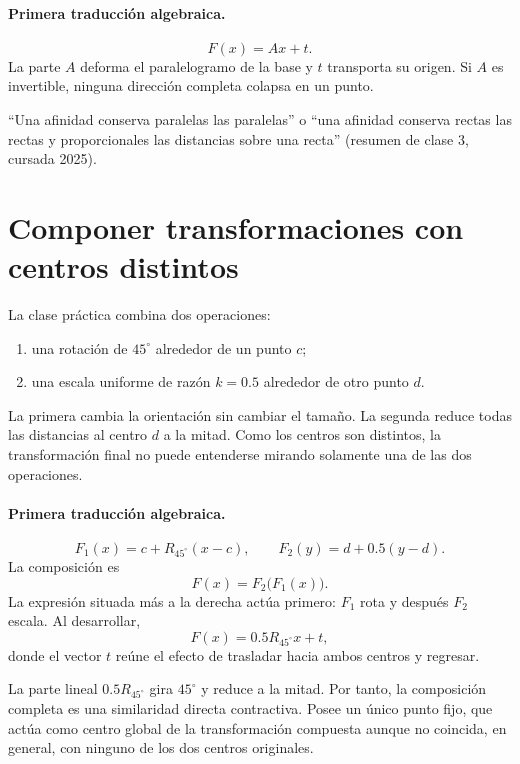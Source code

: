 \paragraph{Primera traducción algebraica.}
\[
  F(x)=Ax+t.
\]
La parte \(A\) deforma el paralelogramo de la base y \(t\) transporta su origen. Si \(A\) es
invertible, ninguna dirección completa colapsa en un punto.

\begin{idea}
``Una afinidad conserva paralelas las paralelas'' o ``una afinidad conserva rectas las
rectas y proporcionales las distancias sobre una recta'' (resumen de clase 3, cursada 2025).
\end{idea}

\section{Componer transformaciones con centros distintos}\label{sec:componer-centros}

La clase práctica combina dos operaciones:
\begin{enumerate}
  \item una rotación de \(45^\circ\) alrededor de un punto \(c\);
  \item una escala uniforme de razón \(k=0.5\) alrededor de otro punto \(d\).
\end{enumerate}
La primera cambia la orientación sin cambiar el tamaño. La segunda reduce todas las distancias
al centro \(d\) a la mitad. Como los centros son distintos, la transformación final no puede
entenderse mirando solamente una de las dos operaciones.

\paragraph{Primera traducción algebraica.}
\[
F_1(x)=c+R_{45^\circ}(x-c),
\qquad
F_2(y)=d+0.5(y-d).
\]
La composición es
\[
F(x)=F_2\bigl(F_1(x)\bigr).
\]
La expresión situada más a la derecha actúa primero: \(F_1\) rota y después \(F_2\) escala.
Al desarrollar,
\[
F(x)=0.5R_{45^\circ}x+t,
\]
donde el vector \(t\) reúne el efecto de trasladar hacia ambos centros y regresar.

\begin{idea}
La parte lineal \(0.5R_{45^\circ}\) gira \(45^\circ\) y reduce a la mitad. Por tanto, la
composición completa es una similaridad directa contractiva. Posee un único punto fijo, que
actúa como centro global de la transformación compuesta aunque no coincida, en general, con
ninguno de los dos centros originales.
\end{idea}

